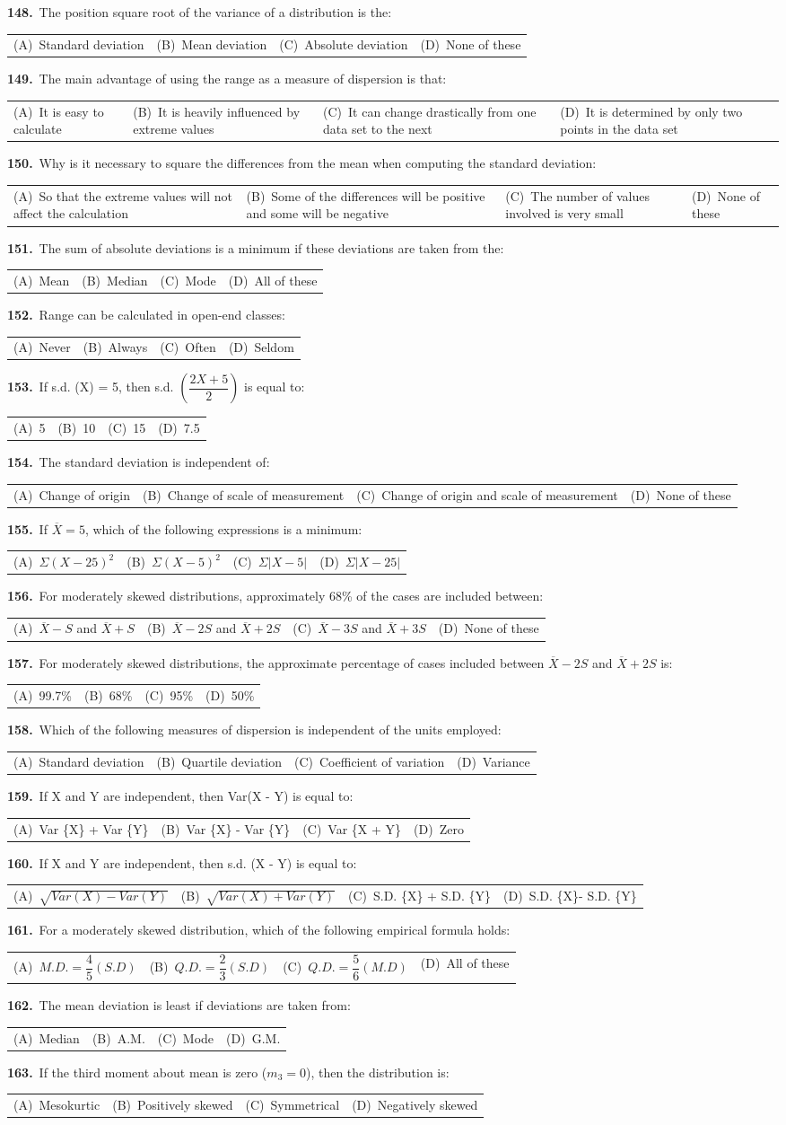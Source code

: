 \documentclass[11pt,a4paper]{article}
\makeatletter
\newcommand{\mcq}[6]{%
  \Needspace{4\baselineskip}%
  \par\medskip\noindent\textbf{#1.}\ #2\par\nopagebreak
  \noindent\begin{tabularx}{\linewidth}{@{\hspace{1.5em}}*{4}{>{\raggedright\arraybackslash}X}@{}}
    (A)~#3 & (B)~#4 & (C)~#5 & (D)~#6
  \end{tabularx}\par}
\makeatother
\begin{document}
\mcq{148}{The position square root of the variance of a distribution is the:}{Standard deviation}{Mean deviation}{Absolute deviation}{None of these}
\mcq{149}{The main advantage of using the range as a measure of dispersion is that:}{It is easy to calculate}{It is heavily influenced by extreme values}{It can change drastically from one data set to the next}{It is determined by only two points in the data set}
\mcq{150}{Why is it necessary to square the differences from the mean when computing the standard deviation:}{So that the extreme values will not affect the calculation}{Some of the differences will be positive and some will be negative}{The number of values involved is very small}{None of these}
\mcq{151}{The sum of absolute deviations is a minimum if these deviations are taken from the:}{Mean}{Median}{Mode}{All of these}
\mcq{152}{Range can be calculated in open-end classes:}{Never}{Always}{Often}{Seldom}
\mcq{153}{If s.d. (X) = 5, then s.d. $\left(\dfrac{2X+5}{2}\right)$ is equal to:}{5}{10}{15}{7.5}
\mcq{154}{The standard deviation is independent of:}{Change of origin}{Change of scale of measurement}{Change of origin and scale of measurement}{None of these}
\mcq{155}{If $\overline{X}=5$, which of the following expressions is a minimum:}{$\Sigma(X-25)^{2}$}{$\Sigma(X-5)^{2}$}{$\Sigma|X-5|$}{$\Sigma|X-25|$}
\mcq{156}{For moderately skewed distributions, approximately 68\% of the cases are included between:}{$\overline{X}-S$ and $\overline{X}+S$}{$\overline{X}-2S$ and $\overline{X}+2S$}{$\overline{X}-3S$ and $\overline{X}+3S$}{None of these}
\mcq{157}{For moderately skewed distributions, the approximate percentage of cases included between $\overline{X}-2S$ and $\overline{X}+2S$ is:}{99.7\%}{68\%}{95\%}{50\%}
\mcq{158}{Which of the following measures of dispersion is independent of the units employed:}{Standard deviation}{Quartile deviation}{Coefficient of variation}{Variance}
\mcq{159}{If X and Y are independent, then Var(X - Y) is equal to:}{Var \{X\} + Var \{Y\}}{Var \{X\} - Var \{Y\}}{Var \{X + Y\}}{Zero}
\mcq{160}{If X and Y are independent, then s.d. (X - Y) is equal to:}{$\sqrt{Var(X)-Var(Y)}$}{$\sqrt{Var(X)+Var(Y)}$}{S.D. \{X\} + S.D. \{Y\}}{S.D. \{X\}- S.D. \{Y\}}
\mcq{161}{For a moderately skewed distribution, which of the following empirical formula holds:}{$M.D.=\dfrac{4}{5}(S.D)$}{$Q.D.=\dfrac{2}{3}(S.D)$}{$Q.D.=\dfrac{5}{6}(M.D)$}{All of these}
\mcq{162}{The mean deviation is least if deviations are taken from:}{Median}{A.M.}{Mode}{G.M.}
\mcq{163}{If the third moment about mean is zero ($m_{3}=0$), then the distribution is:}{Mesokurtic}{Positively skewed}{Symmetrical}{Negatively skewed}
\end{document}
